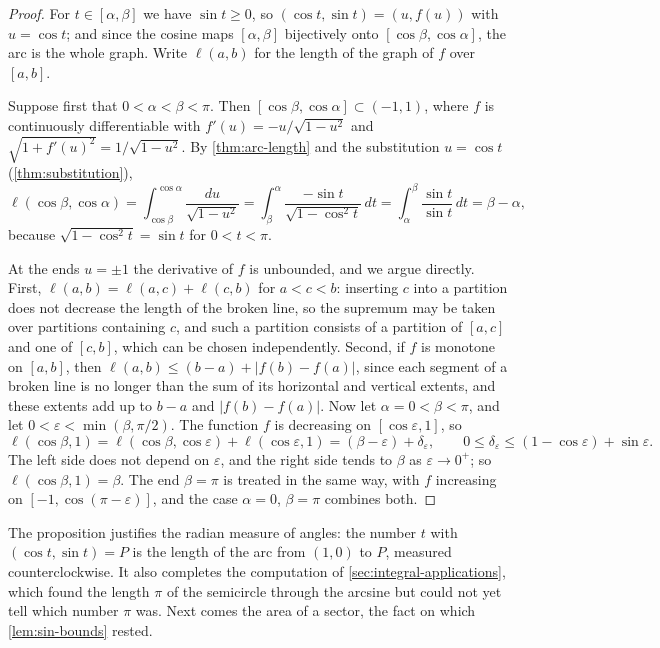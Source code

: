 \begin{proof}
For $t\in[\alpha,\beta]$ we have $\sin t\ge0$, so $(\cos t,\sin t)=(u,f(u))$ with $u=\cos t$; and since the cosine maps $[\alpha,\beta]$ bijectively onto $[\cos\beta,\cos\alpha]$, the arc is the whole graph. Write $\ell(a,b)$ for the length of the graph of $f$ over $[a,b]$.

Suppose first that $0<\alpha<\beta<\pi$. Then $[\cos\beta,\cos\alpha]\subset(-1,1)$, where $f$ is continuously differentiable with $f'(u)=-u/\sqrt{1-u^2}$ and $\sqrt{1+f'(u)^2}=1/\sqrt{1-u^2}$. By \cref{thm:arc-length} and the substitution $u=\cos t$ (\cref{thm:substitution}),
\[
\ell(\cos\beta,\cos\alpha)=\int_{\cos\beta}^{\cos\alpha}\frac{du}{\sqrt{1-u^2}}=\int_\beta^\alpha\frac{-\sin t}{\sqrt{1-\cos^2t}}\,dt=\int_\alpha^\beta\frac{\sin t}{\sin t}\,dt=\beta-\alpha ,
\]
because $\sqrt{1-\cos^2t}=\sin t$ for $0<t<\pi$.

At the ends $u=\pm1$ the derivative of $f$ is unbounded, and we argue directly. First, $\ell(a,b)=\ell(a,c)+\ell(c,b)$ for $a<c<b$: inserting $c$ into a partition does not decrease the length of the broken line, so the supremum may be taken over partitions containing $c$, and such a partition consists of a partition of $[a,c]$ and one of $[c,b]$, which can be chosen independently. Second, if $f$ is monotone on $[a,b]$, then $\ell(a,b)\le(b-a)+|f(b)-f(a)|$, since each segment of a broken line is no longer than the sum of its horizontal and vertical extents, and these extents add up to $b-a$ and $|f(b)-f(a)|$. Now let $\alpha=0<\beta<\pi$, and let $0<\varepsilon<\min(\beta,\pi/2)$. The function $f$ is decreasing on $[\cos\varepsilon,1]$, so
\[
\ell(\cos\beta,1)=\ell(\cos\beta,\cos\varepsilon)+\ell(\cos\varepsilon,1)=(\beta-\varepsilon)+\delta_\varepsilon,\qquad0\le\delta_\varepsilon\le(1-\cos\varepsilon)+\sin\varepsilon .
\]
The left side does not depend on $\varepsilon$, and the right side tends to $\beta$ as $\varepsilon\to0^+$; so $\ell(\cos\beta,1)=\beta$. The end $\beta=\pi$ is treated in the same way, with $f$ increasing on $[-1,\cos(\pi-\varepsilon)]$, and the case $\alpha=0$, $\beta=\pi$ combines both.
\end{proof}

The proposition justifies the radian measure of angles: the number $t$ with $(\cos t,\sin t)=P$ is the length of the arc from $(1,0)$ to $P$, measured counterclockwise. It also completes the computation of \cref{sec:integral-applications}, which found the length $\pi$ of the semicircle through the arcsine but could not yet tell which number $\pi$ was. Next comes the area of a sector, the fact on which \cref{lem:sin-bounds} rested.

